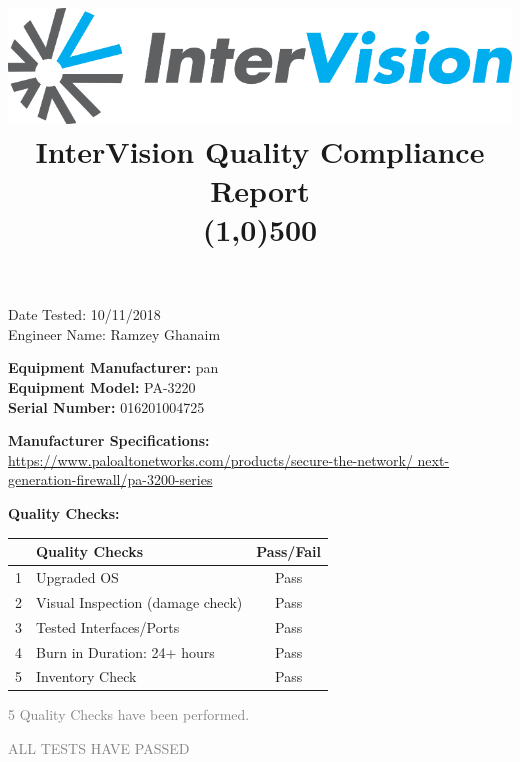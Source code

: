 \documentclass[12pt]{article}
\author{}
\title{\includegraphics[scale=1]{IV_logo.png}
\\InterVision Quality Compliance Report\\\line(1,0){500}\vspace{-8ex}}
\date{}
\begin{document}
\maketitle
\begin{flushright}
Date Tested: 10/11/2018\\
Engineer Name: Ramzey Ghanaim\\
\end{flushright}
\begin{flushleft}
\textbf{Equipment Manufacturer: } pan\\
\textbf{Equipment Model: } PA-3220\\
\textbf{Serial Number: } 016201004725\\
\end{flushleft}
\begin{flushleft}
\textbf{Manufacturer Specifications:} \\\url{https://www.paloaltonetworks.com/products/secure-the-network/ next-generation-firewall/pa-3200-series} \\
\end{flushleft}
\begin{flushleft}
\textbf{Quality Checks:} 
\end{flushleft}
\begin{table}[H]
\centering
\begin{tabular}{|c|l|c|}
 \hline
& \textbf{Quality Checks}  & \textbf{Pass/Fail} \\ \hline
1& Upgraded OS & Pass \\ \hline
2& Visual Inspection (damage check) & Pass \\ \hline
3& Tested Interfaces/Ports & Pass \\ \hline
4& Burn in Duration: 24+ hours & Pass \\ \hline
5& Inventory Check & Pass  \\ \hline
\end{tabular}
\end{table}
\begin{center}
\textcolor{gray}{\huge 5 Quality Checks have been performed.}

\textcolor{gray}{\huge ALL TESTS HAVE PASSED}
\end{center}
\end{document}
